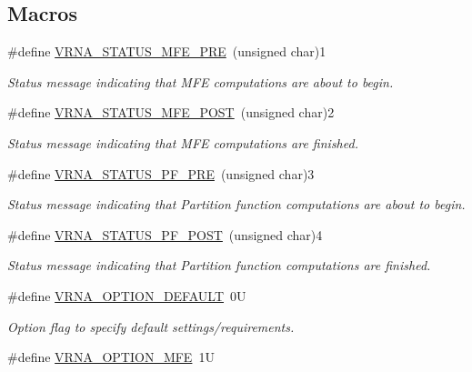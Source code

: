 \subsection*{Macros}
\begin{DoxyCompactItemize}
\item 
\#define \mbox{\hyperlink{group__fold__compound_ga1a5053dc8acbb0111e852988726f07d6}{V\+R\+N\+A\+\_\+\+S\+T\+A\+T\+U\+S\+\_\+\+M\+F\+E\+\_\+\+P\+RE}}~(unsigned char)1
\begin{DoxyCompactList}\small\item\em Status message indicating that M\+FE computations are about to begin. \end{DoxyCompactList}\item 
\#define \mbox{\hyperlink{group__fold__compound_ga47c900ca76e56e59e2e83a06e0bde641}{V\+R\+N\+A\+\_\+\+S\+T\+A\+T\+U\+S\+\_\+\+M\+F\+E\+\_\+\+P\+O\+ST}}~(unsigned char)2
\begin{DoxyCompactList}\small\item\em Status message indicating that M\+FE computations are finished. \end{DoxyCompactList}\item 
\#define \mbox{\hyperlink{group__fold__compound_ga91795d35ebdb6f32be50459f24b3d114}{V\+R\+N\+A\+\_\+\+S\+T\+A\+T\+U\+S\+\_\+\+P\+F\+\_\+\+P\+RE}}~(unsigned char)3
\begin{DoxyCompactList}\small\item\em Status message indicating that Partition function computations are about to begin. \end{DoxyCompactList}\item 
\#define \mbox{\hyperlink{group__fold__compound_ga1c6fa243533fd026e50f7d595eaaa565}{V\+R\+N\+A\+\_\+\+S\+T\+A\+T\+U\+S\+\_\+\+P\+F\+\_\+\+P\+O\+ST}}~(unsigned char)4
\begin{DoxyCompactList}\small\item\em Status message indicating that Partition function computations are finished. \end{DoxyCompactList}\item 
\#define \mbox{\hyperlink{group__fold__compound_gacea5b7ee6181c485f36e2afa0e9089e4}{V\+R\+N\+A\+\_\+\+O\+P\+T\+I\+O\+N\+\_\+\+D\+E\+F\+A\+U\+LT}}~0U
\begin{DoxyCompactList}\small\item\em Option flag to specify default settings/requirements. \end{DoxyCompactList}\item 
\#define \mbox{\hyperlink{group__fold__compound_gae63be9127fe7dcc1f9bb14f5bb1064ee}{V\+R\+N\+A\+\_\+\+O\+P\+T\+I\+O\+N\+\_\+\+M\+FE}}~1U

\end{DoxyCompactItemize}
